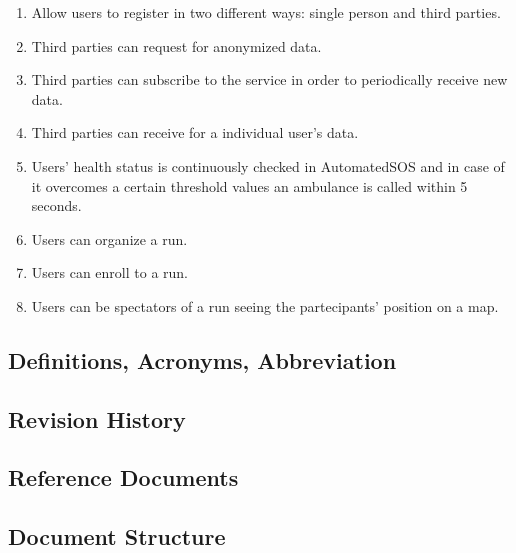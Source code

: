 \documentclass[a4paper]{article}
\begin{document}
    \begin{enumerate}[label*={G.\arabic*}]
        
        
        \item Allow users to register in two different ways: single person and third parties.
        
        
        \item Third parties can request for anonymized data.
    
        \item Third parties can subscribe to the service in order to periodically receive new data.
            
        \item Third parties can receive for a individual user's data.
        
        \item Users' health status is continuously checked in AutomatedSOS and in case of it overcomes a certain threshold values an ambulance is called within 5 seconds.
        
        \item Users can organize a run.
        \item Users can enroll to a run.
        \item Users can be spectators of a run seeing the partecipants' position on a map.
        
    \end{enumerate}
    
    \subsection{Definitions, Acronyms, Abbreviation}
    
    
    \subsection{Revision History}
    
    \subsection{Reference Documents}
    
    \subsection{Document Structure}
    
\end{document}

